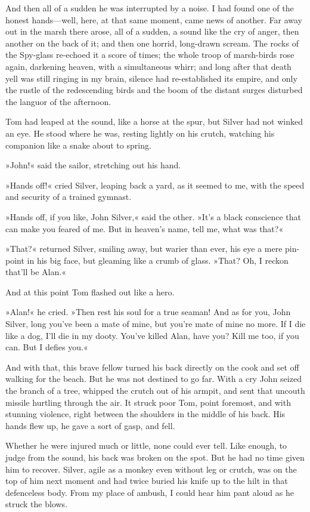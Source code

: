 And then all of a sudden he was interrupted by a noise. I had found one of the honest hands—well, here, at that same moment, came news of another. Far away out in the marsh there arose, all of a sudden, a sound like the cry of anger, then another on the back of it; and then one horrid, long-drawn scream. The rocks of the Spy-glass re-echoed it a score of times; the whole troop of marsh-birds rose again, darkening heaven, with a simultaneous whirr; and long after that death yell was still ringing in my brain, silence had re-established its empire, and only the rustle of the redescending birds and the boom of the distant surges disturbed the languor of the afternoon.

Tom had leaped at the sound, like a horse at the spur, but Silver had not winked an eye. He stood where he was, resting lightly on his crutch, watching his companion like a snake about to spring.

»John!« said the sailor, stretching out his hand.

»Hands off!« cried Silver, leaping back a yard, as it seemed to me, with the speed and security of a trained gymnast.

»Hands off, if you like, John Silver,« said the other. »It's a black conscience that can make you feared of me. But in heaven's name, tell me, what was that?«

»That?« returned Silver, smiling away, but warier than ever, his eye a mere pin-point in his big face, but gleaming like a crumb of glass. »That? Oh, I reckon that'll be Alan.«

And at this point Tom flashed out like a hero.

»Alan!« he cried. »Then rest his soul for a true seaman! And as for you, John Silver, long you've been a mate of mine, but you're mate of mine no more. If I die like a dog, I'll die in my dooty. You've killed Alan, have you? Kill me too, if you can. But I defies you.«

And with that, this brave fellow turned his back directly on the cook and set off walking for the beach. But he was not destined to go far. With a cry John seized the branch of a tree, whipped the crutch out of his armpit, and sent that uncouth missile hurtling through the air. It struck poor Tom, point foremost, and with stunning violence, right between the shoulders in the middle of his back. His hands flew up, he gave a sort of gasp, and fell.

Whether he were injured much or little, none could ever tell. Like enough, to judge from the sound, his back was broken on the spot. But he had no time given him to recover. Silver, agile as a monkey even without leg or crutch, was on the top of him next moment and had twice buried his knife up to the hilt in that defenceless body. From my place of ambush, I could hear him pant aloud as he struck the blows.

